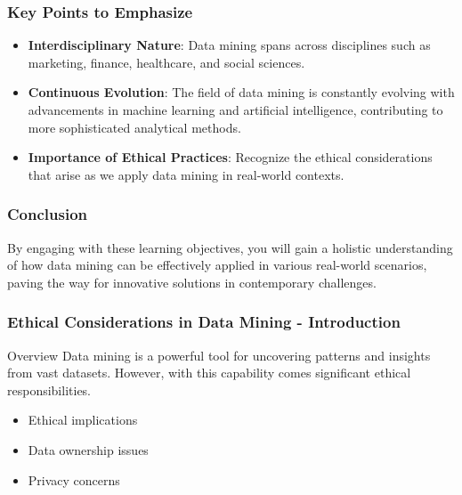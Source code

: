 \documentclass{beamer}
\begin{document}
\begin{frame}[fragile]
    \frametitle{Key Points to Emphasize}
    
    \begin{itemize}
        \item \textbf{Interdisciplinary Nature}: Data mining spans across disciplines such as marketing, finance, healthcare, and social sciences.
        \item \textbf{Continuous Evolution}: The field of data mining is constantly evolving with advancements in machine learning and artificial intelligence, contributing to more sophisticated analytical methods.
        \item \textbf{Importance of Ethical Practices}: Recognize the ethical considerations that arise as we apply data mining in real-world contexts.
    \end{itemize}
\end{frame}

\begin{frame}[fragile]
    \frametitle{Conclusion}
    
    By engaging with these learning objectives, you will gain a holistic understanding of how data mining can be effectively applied in various real-world scenarios, paving the way for innovative solutions in contemporary challenges.
\end{frame}

\begin{frame}[fragile]
    \frametitle{Ethical Considerations in Data Mining - Introduction}
    \begin{block}{Overview}
        Data mining is a powerful tool for uncovering patterns and insights from vast datasets. However, with this capability comes significant ethical responsibilities.
    \end{block}
    \begin{itemize}
        \item Ethical implications
        \item Data ownership issues
        \item Privacy concerns
    \end{itemize}
\end{frame}
\end{document}
